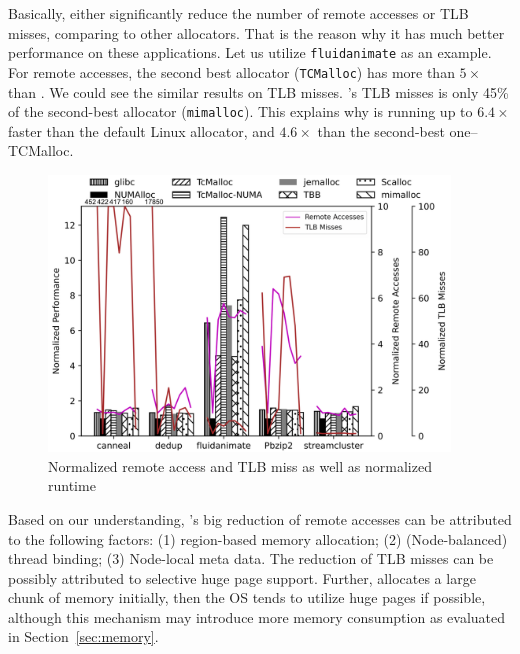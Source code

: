 Basically, \NM{} either significantly reduce the number of remote accesses or TLB misses, comparing to other allocators. That is the reason why it has much better performance on these applications. Let us utilize \texttt{fluidanimate} as an example. For remote accesses, the second best allocator (\texttt{TCMalloc}) has more than $5\times$ than \NM{}. We could see the similar results on TLB misses. \NM{}'s TLB misses is only 45\% of the second-best allocator (\texttt{mimalloc}). This explains why \NM{} is running up to $6.4\times$ faster than the default Linux allocator, and  $4.6\times$ than the second-best one--TCMalloc.


\begin{figure}[!h]
    \centering
    \includegraphics[width=4.2in]{figure/remote-access.pdf}
    \caption{Normalized remote access and TLB miss as well as normalized runtime}
    \label{fig:remoteAccess}
\end{figure}

Based on our understanding, \NM{}'s big reduction of remote accesses can be attributed to the following factors: (1) region-based memory allocation; (2) (Node-balanced) thread binding; (3) Node-local meta data. The reduction of TLB misses can be possibly attributed to selective huge page support. Further, \NM{} allocates a large chunk of memory initially, then the OS tends to utilize huge pages if possible, although this mechanism may introduce more memory consumption as evaluated in Section~\ref{sec:memory}.  

